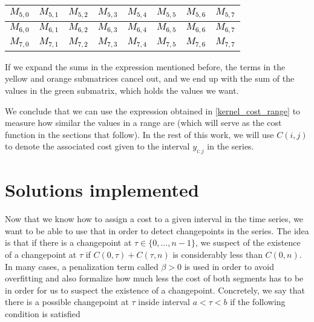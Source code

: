 \documentclass[pdflatex,sn-mathphys]{sn-jnl}%
\theoremstyle{thmstyleone}%
\theoremstyle{thmstyletwo}%
\theoremstyle{thmstylethree}%
\begin{document}
\begin{center}
\begin{tabular}{|p{0.83cm}|p{0.83cm}|p{0.83cm}|p{0.83cm}|p{0.83cm}|p{0.83cm}|p{0.83cm}|p{0.83cm}|}
             \cellcolor{black!0}\textcolor{black}{$M_{5,0}$} & \cellcolor{black!0}\textcolor{black}{$M_{5,1}$} & \cellcolor{red!50}\textcolor{black}{$M_{5,2}$} & \cellcolor{black!0}\textcolor{black}{$M_{5,3}$} & \cellcolor{black!0}\textcolor{black}{$M_{5,4}$} & \cellcolor{green!50}\textcolor{black}{$M_{5,5}$} & \cellcolor{black!0}\textcolor{black}{$M_{5,6}$} & \cellcolor{black!0}\textcolor{black}{$M_{5,7}$}\\
        \hline
            \cellcolor{black!0}\textcolor{black}{$M_{6,0}$} & \cellcolor{black!0}\textcolor{black}{$M_{6,1}$} & \cellcolor{black!0}\textcolor{black}{$M_{6,2}$} & \cellcolor{black!0}\textcolor{black}{$M_{6,3}$} & \cellcolor{black!0}\textcolor{black}{$M_{6,4}$} & \cellcolor{black!0}\textcolor{black}{$M_{6,5}$} & \cellcolor{black!0}\textcolor{black}{$M_{6,6}$} & \cellcolor{black!0}\textcolor{black}{$M_{6,7}$} \\
        \hline
        \cellcolor{black!0}\textcolor{black}{$M_{7,0}$} & \cellcolor{black!0}\textcolor{black}{$M_{7,1}$} & \cellcolor{black!0}\textcolor{black}{$M_{7,2}$} & \cellcolor{black!0}\textcolor{black}{$M_{7,3}$} & \cellcolor{black!0}\textcolor{black}{$M_{7,4}$} & \cellcolor{black!0}\textcolor{black}{$M_{7,5}$} & \cellcolor{black!0}\textcolor{black}{$M_{7,6}$} & \cellcolor{black!0}\textcolor{black}{$M_{7,7}$} \\
        \hline
        \end{tabular}
\end{center}

\medskip

If we expand the sums in the expression mentioned before, the terms in the yellow and orange submatrices cancel out, and we end up with the sum of the values in the green submatrix, which holds the values we want. 

We conclude that we can use the expression obtained in \ref{kernel_cost_range} to measure how similar the values in a range are (which will serve as the cost function in the sections that follow). In the rest of this work, we will use $C(i,j)$ to denote the associated cost given to the interval $y_{i:j}$ in the series.

\section{Solutions implemented}\label{solutions}

Now that we know how to assign a cost to a given interval in the time series, we want to be able to use that in order to detect changepoints in the series. The idea is that if there is a changepoint at $\tau \in \{0, \dots, n-1 \}$, we suspect of the existence of a changepoint at $\tau$ if $C(0,\tau) + C(\tau, n)$ is considerably less than $C(0, n)$. In many cases, a penalization term called $\beta > 0$ is used in order to avoid overfitting and also formalize how much less the cost of both segments has to be in order for us to suspect the existence of a changepoint. Concretely, we say that there is a possible changepoint at $\tau$ inside interval $a < \tau < b$ if the following condition is satisfied
\end{document}
